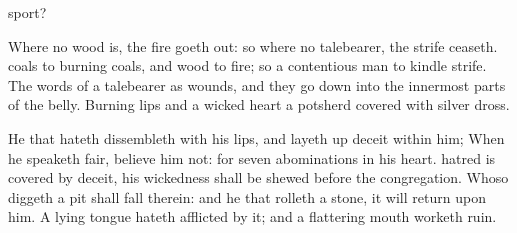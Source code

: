{sport?
\par }{\PP {}Where
no
wood is,
{} the
fire goeth
out: so where
{} no
talebearer, the
strife
ceaseth.
coals
{} to burning
coals, and
wood to
fire; so
{} a
contentious
man to
kindle
strife.
The
words of a
talebearer
{} as
wounds, and they go
down into the innermost
parts of the
belly.
Burning
lips and a
wicked
heart
{} a
potsherd
covered with
silver
dross.
\par }{\PP {}He that
hateth
dissembleth with his
lips, and layeth
up
deceit
within him;
When he
speaketh
fair,
believe him not: for
{}
seven
abominations in his
heart.
hatred is
covered by
deceit, his
wickedness shall be
shewed before the
{}
congregation.
Whoso
diggeth a
pit shall
fall therein: and he that
rolleth a
stone, it will
return upon him.
A
lying
tongue
hateth
{}
afflicted by it; and a
flattering
mouth
worketh
ruin.

}
